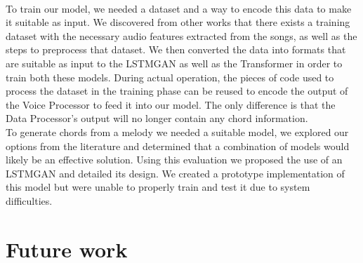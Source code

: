 \\
To train our model, we needed a dataset and a way to encode this data to make it suitable as input. 
We discovered from other works that there exists a training dataset with the necessary audio features extracted from the songs, as well as the steps to preprocess that dataset. 
We then converted the data into formats that are suitable as input to the LSTMGAN as well as the Transformer in order to train both these models. 
During actual operation, the pieces of code used to process the dataset in the training phase can be reused to encode the output of the Voice Processor to feed it into our model. 
The only difference is that the Data Processor’s output will no longer contain any chord information.
\\
To generate chords from a melody we needed a suitable model, we explored our options from the literature and determined that a combination of models would likely be an effective solution.
Using this evaluation we proposed the use of an LSTMGAN and detailed its design.
We created a prototype implementation of this model but were unable to properly train and test it due to system difficulties.

\section{Future work}

